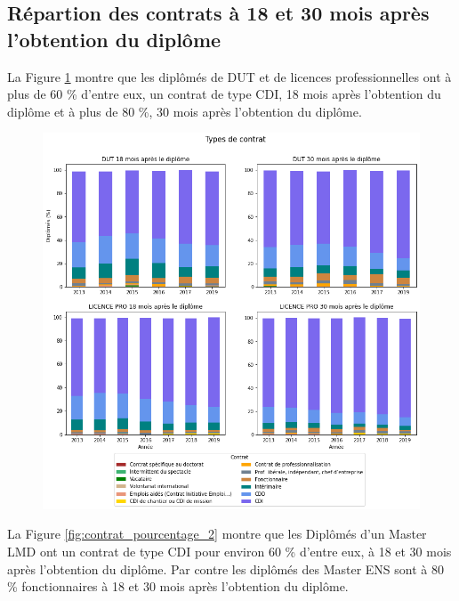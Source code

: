 \documentclass[12pt, a4paper, titlepage, table]{article}
\begin{document}
\newpage

	\subsection{Répartion des contrats à 18 et 30 mois après l'obtention du diplôme}
	La Figure \ref{fig:contrat_pourcentage_1} montre que les diplômés de DUT et de licences professionnelles ont à plus de 60 \%  d'entre eux, un contrat de type CDI, 18 mois après l'obtention du diplôme et à plus de 80 \%, 30 mois après l'obtention du diplôme.   
	
		\begin{figure}[H]
			\centering
			\includegraphics[width=1\textwidth]{../graphs/repartition_contrats_situation_1.png}
			\label{fig:contrat_pourcentage_1}
		\end{figure}
	
	La Figure \ref{fig:contrat_pourcentage_2} montre que les Diplômés d'un Master LMD ont un contrat de type CDI pour environ 60 \% d'entre eux, à 18 et 30 mois après l'obtention du diplôme.
	Par contre les diplômés des Master ENS sont à 80 \% fonctionnaires à 18 et 30 mois après l'obtention du diplôme. 
\end{document}
